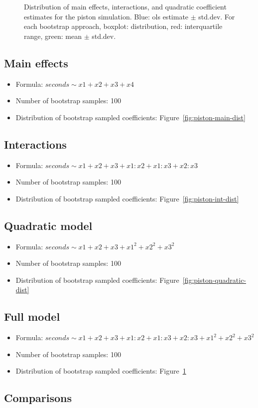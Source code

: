 \documentclass{article}
\begin{document}
\begin{figure}
    \caption{Distribution of main effects, interactions, and quadratic coefficient estimates for the piston simulation. 
        Blue: ols estimate $\pm$ std.dev. 
        For each bootstrap approach, boxplot: distribution, red: interquartile range, green: mean $\pm$ std.dev.}
    \label{fig:piston-full-dist}
\end{figure}


\subsection{Main effects}
\begin{itemize}
    \item Formula: $seconds \sim x1 + x2 + x3 + x4$
    \item Number of bootstrap samples: 100
    \item Distribution of bootstrap sampled coefficients: Figure~\ref{fig:piston-main-dist}
\end{itemize}

\subsection{Interactions}
\begin{itemize}
    \item Formula: $seconds \sim x1 + x2 + x3 + x1:x2 + x1:x3 + x2:x3$
    \item Number of bootstrap samples: 100
    \item Distribution of bootstrap sampled coefficients: Figure~\ref{fig:piston-int-dist}
\end{itemize}

\subsection{Quadratic model}
\begin{itemize}
    \item Formula: $seconds \sim x1 + x2 + x3 + x1^2 + x2^2 + x3^2$
    \item Number of bootstrap samples: 100
    \item Distribution of bootstrap sampled coefficients: Figure~\ref{fig:piston-quadratic-dist}
\end{itemize}

\subsection{Full model}
\begin{itemize}
    \item Formula: $seconds \sim x1 + x2 + x3 + x1:x2 + x1:x3 + x2:x3 + x1^2 + x2^2 + x3^2$
    \item Number of bootstrap samples: 100
    \item Distribution of bootstrap sampled coefficients: Figure~\ref{fig:piston-full-dist}
\end{itemize}

\subsection{Comparisons}






\end{document}
